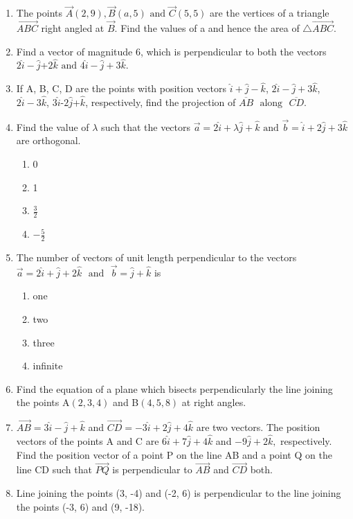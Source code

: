 \begin{enumerate}[label=\thesubsection.\arabic*, ref=\thesubsection.\theenumi]
\item The points $\vec{A}(2, 9), \vec{B}(a, 5) \text{ and }\vec{C}(5, 5)$ are the vertices of a triangle $\vec{ABC}$ right angled at $\vec{B}$. Find the values of a and hence the area of $\triangle \vec{ABC}$.
\item Find a vector of magnitude 6,  which is perpendicular to both the vectors $2\hat{i}-\hat{j}$+$2\hat{k}\text{ and }4\hat{i}-\hat{j}+3\hat{k}$.
\item If A, B, C, D  are the points with position vectors $\hat{i}+\hat{j}-\hat{k}$,  $2\hat{i}-\hat{j}+3\hat{k}$,  $2\hat{i}-3\hat{k}$,  $3\hat{i}$-$2\hat{j}$+$\hat{k}$,  respectively,  find the projection of $\overline{AB}$ $\text{ along }$ $\overline{CD}$.
\item Find the value of $\lambda$ such that the vectors $\vec{a}=2\hat{i}+\lambda\hat{j}+\hat{k}$ $\text{and}$ $\vec{b}=\hat{i}+2\hat{j}+3\hat{k}$ are orthogonal.
	\begin{enumerate}
\item 0
\item 1 
\item $\frac{3}{2}$
\item $-\frac{5}{2}$
	\end{enumerate}
\item The number of vectors of unit length perpendicular to the vectors $\vec{a}=2\hat{i}+\hat{j}+2\hat{k}$ $\text{ and }$ $\vec{b}=\hat{j}+\hat{k}$ is
	\begin{enumerate}
\item one
\item  two
\item three
\item infinite
\end{enumerate}
\item Find the equation of a plane which  bisects perpendicularly the line joining the points A$(2, 3, 4)$ and B$(4, 5, 8)$ at right angles.
\item $\overrightarrow{AB}=3\hat{i}-\hat{j}+\hat{k}$ and $\overrightarrow{CD}=-3\hat{i}+2\hat{j}+4\hat{k}$ are two vectors. The position vectors of the points A and C are $6\hat{i}+7\hat{j}+4\hat{k}$ and $-9\hat{j}+2\hat{k}, $ respectively. Find the position vector of a point P on the line AB and a point Q on the line CD such that $\overrightarrow{PQ}$ is perpendicular to $\overrightarrow{AB}$ and $\overrightarrow{CD}$ both.
\item Line joining the points (3, -4) and (-2, 6) is perpendicular to the line joining the points (-3, 6) and (9, -18).

\end{enumerate}
